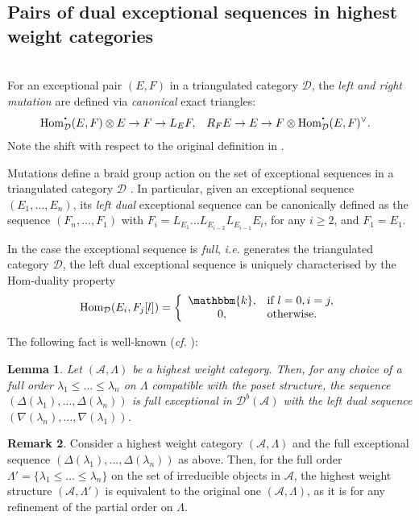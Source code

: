 \documentclass[12pt,a4paper]{amsart}
\newcommand{\aA}{{\mathcal{A}}}
\newcommand{\dD}{{\mathcal{D}}}
\newcommand{\la}{\lambda}
\newcommand{\kk}{\mathbbm{k}}
\newcommand{\bcdot}{{\mbox{\boldmath{$\cdot$}}}}
\newcommand{\Hom}{\mathop{\textrm{Hom}}\nolimits}
\newtheorem{LEM}{Lemma}[section]
\theoremstyle{definition}
\newtheorem{REM}[LEM]{Remark}
\begin{document}
\subsection{Pairs of dual exceptional sequences in highest weight categories}\label{ssec_dual_exc_coll}~\\

 For an exceptional pair $(E, F )$ in a triangulated category $\dD$, the \emph{left and right mutation} are defined via \emph{canonical} exact triangles:
\begin{align*}
&\Hom_{\dD}^\bcdot(E,F) \otimes E \to F \to L_EF,& &R_FE \to E \to F \otimes \Hom_{\dD}^\bcdot(E,F)^\vee.&
\end{align*}
Note the shift with respect to the original definition in \cite{B}. 

Mutations define a braid group action on the set of exceptional sequences in a triangulated category $\dD$ \cite{B}. In particular, given an exceptional sequence $(E_1,\ldots, E_n)$, its \emph{left dual} exceptional sequence can be canonically defined as the sequence $(F_n,\ldots,F_1)$ with $F_i =L_{E_1}\ldots L_{E_{i-2}} L_{E_{i-1}} E_i$, for any $i\geq 2$, and $F_1 = E_1$. 

In the case the exceptional sequence is {\it full}, {\it i.e.} generates the triangulated category $\dD$, the left dual exceptional sequence is uniquely characterised by the Hom-duality property 
\begin{equation}\label{eqtn_dual_collec}
\Hom_{\dD}(E_i,F_j[l]) = \left\{\begin{array}{cl}\kk, & \textrm{if }l=0, i=j,\\0, & \textrm{otherwise.} \end{array} \right. 
\end{equation} 

The following fact is well-known (\emph{cf.} \cite[Proposition 4.19]{Rou4}):
\begin{LEM}\label{lem_two_exc_coll}
	Let $(\aA, \Lambda)$ be a highest weight category. Then, for any choice of a full order $\la_1 \leq \ldots \leq \la_n$ on $\Lambda$ compatible with the poset structure, the
	sequence $(\Delta(\lambda_1),\ldots, \Delta(\lambda_n) )$ is full exceptional in $\dD^b(\aA)$ with the left dual sequence $(\nabla(\lambda_n),\ldots, \nabla(\lambda_1) )$.
\end{LEM}
\begin{REM}\label{rem_hws_by_st}
	Consider a highest weight category $(\aA, \Lambda)$ and the full exceptional sequence $(\Delta(\lambda_1),\ldots, \Delta(\lambda_n) )$ as above.
	Then, for the full order  $\Lambda' = \{\la_1\leq \ldots \leq \la_n\}$ on the set 
	of irreducible objects in $\aA$, the highest weight structure $(\aA, \Lambda')$ is equivalent to the original one $(\aA, \Lambda)$, as it is for any refinement of the partial order on $\Lambda$.
\end{REM}
\vspace{0.3cm}
\end{document}

